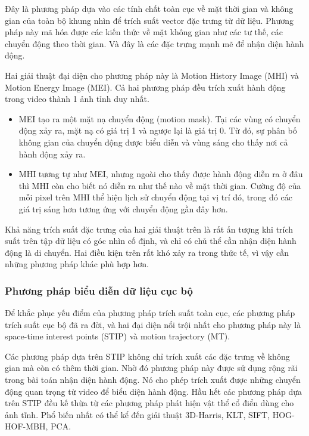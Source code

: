 Đây là phương pháp dựa vào các tính chất toàn cục về mặt thời gian và không gian của toàn bộ khung nhìn để trích suất vector đặc trưng từ dữ liệu. Phương pháp này mã hóa được các kiến thức về mặt không gian như các tư thế, các chuyển động theo thời gian. Và đây là các đặc trưng mạnh mẽ để nhận diện hành động.

Hai giải thuật đại diện cho phương pháp này là Motion History Image (MHI) và Motion Energy Image (MEI). Cả hai phương pháp đều trích xuất hành động trong video thành 1 ảnh tỉnh duy nhất.

\begin{itemize}
    \item MEI tạo ra một mặt nạ chuyển động (motion mask). Tại các vùng có chuyển động xảy ra, mặt nạ có giá trị 1 và ngược lại là giá trị 0. Từ đó, sự phân bố không gian của chuyển động được biểu diễn và vùng sáng cho thấy nơi cả hành động xảy ra.
    \item MHI tương tự như MEI, nhưng ngoài cho thấy được hành động diễn ra ở đâu thì MHI còn cho biết nó diễn ra như thế nào về mặt thời gian. Cường độ của mỗi pixel trên MHI thể hiện lịch sử chuyển động tại vị trí đó, trong đó các giá trị sáng hơn tương ứng với chuyển động gần đây hơn.
\end{itemize}

Khả năng trích suất đặc trưng của hai giải thuật trên là rất ấn tượng khi trích suất trên tập dữ liệu có góc nhìn cố định, và chỉ có chủ thể cần nhận diện hành động là di chuyển. Hai điều kiện trên rất khó xảy ra trong thức tế, vì vậy cần những phương pháp khác phù hợp hơn.


\subsubsection{Phương pháp biểu diễn dữ liệu cục bộ}

Để khắc phục yếu điểm của phương pháp trích suất toàn cục, các phương pháp trích suất cục bộ đã ra đời, và hai đại diện nổi trội nhất cho phương pháp này là space-time interest points (STIP) và motion trajectory (MT).

Các phương pháp dựa trên STIP không chỉ trích xuất các đặc trưng về không gian mà còn có thêm thời gian. Nhờ đó phương pháp này được sử dụng rộng rãi trong bài toán nhận diện hành động. Nó cho phép trích xuất được những chuyển động quan trọng từ video để biểu diện hành động. Hầu hết các phương pháp dựa trên STIP đều kế thừa từ các phương pháp phát hiện vật thể cổ điển dùng cho ảnh tĩnh. Phổ biến nhất có thể kể đến giải thuật 3D-Harris, KLT, SIFT, HOG-HOF-MBH, PCA.


